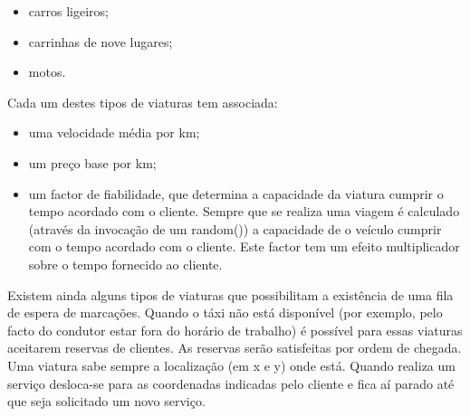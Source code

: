\begin{itemize}
	\item carros ligeiros;
	\item carrinhas de nove lugares;
	\item motos.
\end{itemize}
Cada um destes tipos de viaturas tem associada:
\begin{itemize}
	\item uma velocidade média por km;
	\item um preço base por km;
	\item um factor de fiabilidade, que determina a capacidade da viatura cumprir o tempo acordado com o cliente. Sempre que se realiza uma viagem é calculado (através da invocação de um random()) a capacidade de o veículo cumprir com o tempo acordado com o cliente. Este factor tem um efeito multiplicador sobre o tempo fornecido ao cliente.
\end{itemize}

Existem ainda alguns tipos de viaturas que possibilitam a existência de uma fila de espera de marcações. Quando o táxi não está disponível (por exemplo, pelo facto do condutor estar fora do horário de trabalho) é possível para essas viaturas aceitarem reservas de clientes. As reservas serão satisfeitas por ordem de chegada. Uma viatura sabe sempre a localização (em x e y) onde está. Quando realiza um serviço desloca-se para as coordenadas indicadas pelo cliente e fica aí parado até que seja solicitado um novo serviço.

